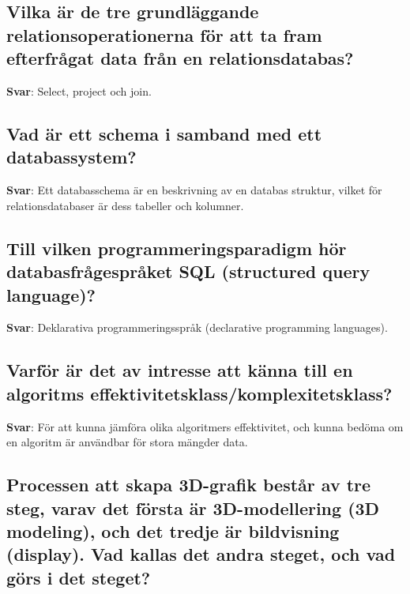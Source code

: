 \documentclass[a4paper,11pt,oneside]{article}
\begin{document}
\begin{sloppypar}
\subsection{Vilka \"ar de tre grundl\"aggande relationsoperationerna f\"or att ta fram efterfr\r{a}gat data fr\r{a}n en relationsdatabas?}

\label{q:297:sa:sv:True}

\textbf{Svar}: Select, project och join.



\subsection{Vad \"ar ett schema i samband med ett databassystem?}

\label{q:298:sa:sv:True}

\textbf{Svar}: Ett databasschema \"ar en beskrivning av en databas struktur, vilket f\"or relationsdatabaser \"ar dess tabeller och kolumner.



\subsection{Till vilken programmeringsparadigm h\"or databasfr\r{a}gespr\r{a}ket SQL (structured query language)?}

\label{q:299:sa:sv:True}

\textbf{Svar}: Deklarativa programmeringsspr\r{a}k (declarative programming languages).



\subsection{Varf\"or \"ar det av intresse att k\"anna till en algoritms effektivitetsklass/komplexitetsklass?}

\label{q:300:sa:sv:True}

\textbf{Svar}: F\"or att kunna j\"amf\"ora olika algoritmers effektivitet, och kunna bed\"oma om en algoritm \"ar anv\"andbar f\"or stora m\"angder data.



\subsection{Processen att skapa 3D-grafik best\r{a}r av tre steg, varav det f\"orsta \"ar 3D-modellering (3D modeling), och det tredje \"ar bildvisning (display). Vad kallas det andra steget, och vad g\"ors i det steget?}


\end{sloppypar}
\end{document}

